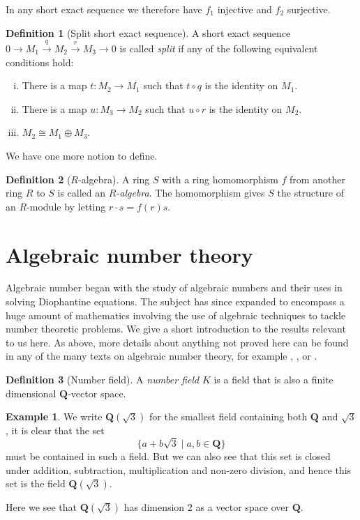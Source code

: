 \documentclass[12pt,a4paper,abstracton,bibtotoc]{scrreprt}
\theoremstyle{definition}
\newtheorem{defn}{Definition}
\newtheorem{ex}{Example}
\newcommand{\QQ}{\mathbf{Q}}
\begin{document}
In any short exact sequence we therefore have $f_1$ injective and $f_2$ surjective.

\begin{defn}[Split short exact sequence]
A short exact sequence $0 \to M_1 \xrightarrow{q} M_2 \xrightarrow{r} M_3 \to 0$ is called \emph{split} if any of the following equivalent conditions hold:
\begin{enumerate}[(i)]
\item There is a map $t\colon M_2 \to M_1$ such that $t\circ q$ is the identity on $M_1$.
\item There is a map $u\colon M_3 \to M_2$ such that $u\circ r$ is the identity on $M_2$.
\item $M_2 \cong M_1 \oplus M_3$.
\end{enumerate}
\end{defn}

We have one more notion to define.

\begin{defn}[$R$-algebra]
A ring $S$ with a ring homomorphism $f$ from another ring $R$ to $S$ is called an \emph{$R$-algebra}.
The homomorphism gives $S$ the structure of an $R$-module by letting $r\cdot s = f(r)s$.
\end{defn}

\section{Algebraic number theory}
\label{sec:ant}

Algebraic number began with the study of algebraic numbers and their uses in solving Diophantine equations.
The subject has since expanded to encompass a huge amount of mathematics involving the use of algebraic techniques to tackle number theoretic problems.
We give a short introduction to the results relevant to us here.
As above, more details about anything not proved here can be found in any of the many texts on algebraic number theory, for example \cite{neukirch}, \cite{lang}, \cite{narkiewicz} or \cite{stewtall}.

\begin{defn}[Number field]
A \emph{number field} $K$ is a field that is also a finite dimensional $\QQ$-vector space.
\end{defn}

\begin{ex}\label{ex:quad}
We write $\QQ(\sqrt{3})$ for the smallest field containing both $\QQ$ and $\sqrt{3}$, it is clear that the set
\[
\{a + b\sqrt{3}\mid a,b \in \QQ\}
\]
must be contained in such a field.
But we can also see that this set is closed under addition, subtraction, multiplication and non-zero division, and hence this set is the field $\QQ(\sqrt{3})$.

Here we see that $\QQ(\sqrt{3})$ has dimension 2 as a vector space over $\QQ$.
\end{ex}
\end{document}
